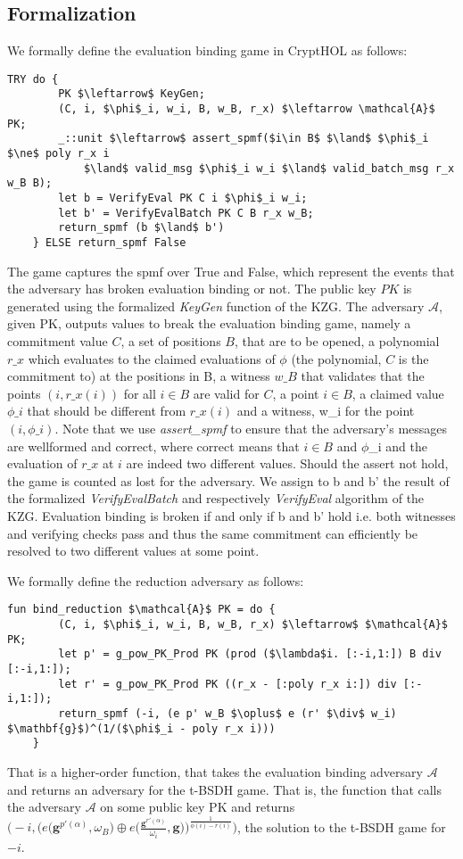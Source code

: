 \subsection*{Formalization}
We formally define the evaluation binding game in CryptHOL as follows:
\begin{lstlisting}[language=isabelle]
    TRY do {
        PK $\leftarrow$ KeyGen;
        (C, i, $\phi$_i, w_i, B, w_B, r_x) $\leftarrow \mathcal{A}$ PK;
        _::unit $\leftarrow$ assert_spmf($i\in B$ $\land$ $\phi$_i $\ne$ poly r_x i 
            $\land$ valid_msg $\phi$_i w_i $\land$ valid_batch_msg r_x w_B B);
        let b = VerifyEval PK C i $\phi$_i w_i;
        let b' = VerifyEvalBatch PK C B r_x w_B;
        return_spmf (b $\land$ b')
    } ELSE return_spmf False
\end{lstlisting}
The game captures the spmf over True and False, which represent the events that the adversary has broken evaluation binding or not.
The public key $PK$ is generated using the formalized \textit{KeyGen} function of the KZG. The adversary $\mathcal{A}$, given PK, outputs values to break the evaluation binding game, namely a commitment value $C$, a set of positions $B$, that are to be opened, a polynomial $r\_x$ which evaluates to the claimed evaluations of $\phi$ (the polynomial, $C$ is the commitment to) at the positions in B, a witness $w\_B$ that validates that the points $(i,r\_x(i))$ for all $i \in B$ are valid for $C$, a point $i \in B$, a claimed value $\phi\_i$ that should be different from $r\_x(i)$ and a witness, w\_i for the point $(i,\phi\_i)$. 
Note that we use \textit{assert\_spmf} to ensure that the adversary's messages are wellformed and correct, where correct means that $i \in B$ and $\phi$\_i and the evaluation of $r\_x$ at $i$ are indeed two different values. Should the assert not hold, the game is counted as lost for the adversary.
We assign to b and b' the result of the formalized \textit{VerifyEvalBatch} and respectively \textit{VerifyEval} algorithm of the KZG. Evaluation binding is broken if and only if b and b' hold i.e. both witnesses and verifying checks pass and thus the same commitment can efficiently be resolved to two different values at some point.

We formally define the reduction adversary as follows:
\begin{lstlisting}[language=isabelle]
    fun bind_reduction $\mathcal{A}$ PK = do {
        (C, i, $\phi$_i, w_i, B, w_B, r_x) $\leftarrow$ $\mathcal{A}$ PK;
        let p' = g_pow_PK_Prod PK (prod ($\lambda$i. [:-i,1:]) B div [:-i,1:]);
        let r' = g_pow_PK_Prod PK ((r_x - [:poly r_x i:]) div [:-i,1:]);
        return_spmf (-i, (e p' w_B $\oplus$ e (r' $\div$ w_i) $\mathbf{g}$)^(1/($\phi$_i - poly r_x i)))
    }
\end{lstlisting}
That is a higher-order function, that takes the evaluation binding adversary $\mathcal{A}$ and returns an adversary for the t-BSDH game.
That is, the function that calls the adversary $\mathcal{A}$ on some public key PK and returns $\bigl(-i, \bigl(e\bigl(\mathbf{g}^{p'(\alpha)}, \omega_B\bigr) \oplus e\bigl(\frac{\mathbf{g}^{r'(\alpha)}}{\omega_i}, \mathbf{g}\bigr)\bigr)^{\frac{1}{\phi(i)-r(i)}}\bigr)$, the solution to the t-BSDH game for $-i$. 

